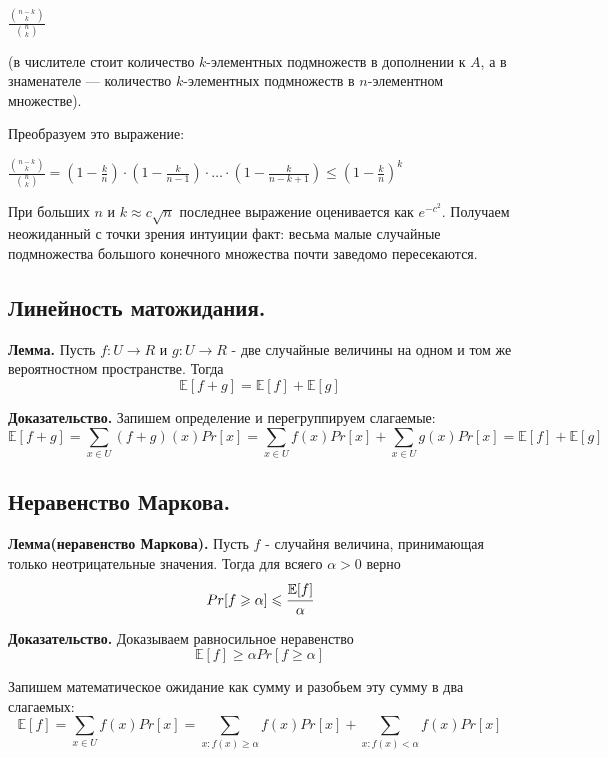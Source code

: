 \documentclass[a4paper, 10pt]{article}
\begin{document}
\begin{center}
    $\displaystyle \frac{\binom{n - k}{k}}{\binom{n}{k}}$
\end{center}

(в числителе стоит количество $k$-элементных подмножеств в дополнении к $A$, а в знаменателе — количество $k$-элементных подмножеств в $n$-элементном множестве).

Преобразуем это выражение:

\begin{center}
    $\displaystyle \frac{\binom{n - k}{k}}{\binom{n}{k}} = (1 - \frac{k}{n}) \cdot (1 - \frac{k}{n - 1}) \cdot \dots \cdot (1 - \frac{k}{n - k + 1}) \leqslant (1 - \frac{k}{n})^k$
\end{center}

При больших $n$ и $k \approx c\sqrt{n}$ последнее выражение оценивается как $e^{-c^2}$. Получаем неожиданный с точки зрения интуиции факт: весьма малые случайные подмножества большого конечного множества почти заведомо пересекаются.


\subsection{Линейность матожидания.}

\textbf{Лемма.} Пусть $f : U \to R$ и $g : U \to R$ - две случайные величины на одном и том же вероятностном пространстве. Тогда $$\mathbb{E}[f + g] = \mathbb{E}[f] + \mathbb{E}[g]$$

\textbf{Доказательство.} Запишем определение и перегруппируем слагаемые: $$\mathbb{E}[f + g] = \sum_{x \in U}(f + g)(x)Pr[x] = \sum_{x \in U}f(x)Pr[x] + \sum_{x \in U}g(x)Pr[x] = \mathbb{E}[f] + \mathbb{E}[g]$$

\subsection{Неравенство Маркова.}

\textbf{Лемма(неравенство Маркова).} Пусть $f$ - случайня величина, принимающая только неотрицательные значения. Тогда для всяего $\alpha > 0$ верно $$Pr[f \geqslant \alpha] \leqslant \cfrac{\mathbb{E}[f]}{\alpha}$$

\textbf{Доказательство.} Доказываем равносильное неравенство $$\mathbb{E}[f] \geqslant \alpha Pr[f \geqslant \alpha]$$

Запишем математическое ожидание как сумму и разобьем эту сумму в два слагаемых: $$\mathbb{E}[f] = \sum_{x \in U} f(x)Pr[x] = \sum_{x : f(x) \geqslant \alpha}f(x)Pr[x] + \sum_{x : f(x) < \alpha}f(x)Pr[x]$$
\end{document}
